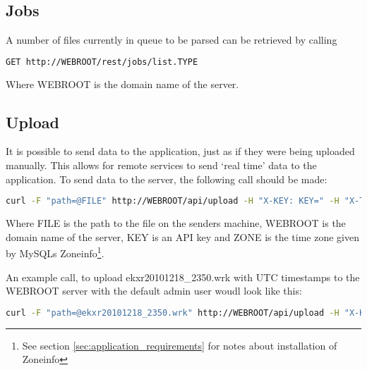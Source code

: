 \subsection{Jobs}
A number of files currently in queue to be parsed can be retrieved by calling
\begin{lstlisting}[language=sh]
GET http://WEBROOT/rest/jobs/list.TYPE
\end{lstlisting}
Where \textsf{WEBROOT} is the domain name of the server.

\subsection{Upload}
It is possible to send data to the application, just as if they were being uploaded manually. This allows for remote services to send `real time' data to the application. To send data to the server, the following call should be made:
\begin{lstlisting}[language=sh]
curl -F "path=@FILE" http://WEBROOT/api/upload -H "X-KEY: KEY=" -H "X-TIMEZONE: ZONE" -X POST
\end{lstlisting}
Where \textsf{FILE} is the path to the file on the senders machine, \textsf{WEBROOT} is the domain name of the server, \textsf{KEY} is an API key and \textsf{ZONE} is the time zone given by MySQLs Zoneinfo\footnote{See section \ref{sec:application_requirements} for notes about installation of Zoneinfo}.

An example call, to upload \textsf{ekxr20101218\_2350.wrk} with UTC timestamps to the \textsf{WEBROOT} server with the default admin user woudl look like this:
\begin{lstlisting}[language=sh]
curl -F "path=@ekxr20101218_2350.wrk" http://WEBROOT/api/upload -H "X-KEY: YWqmPGH+dOEvOh6pf83a62lzJ1QQLHRMPHhNIaohB3s=" -H "X-TIMEZONE: UTC" -X POST
\end{lstlisting}